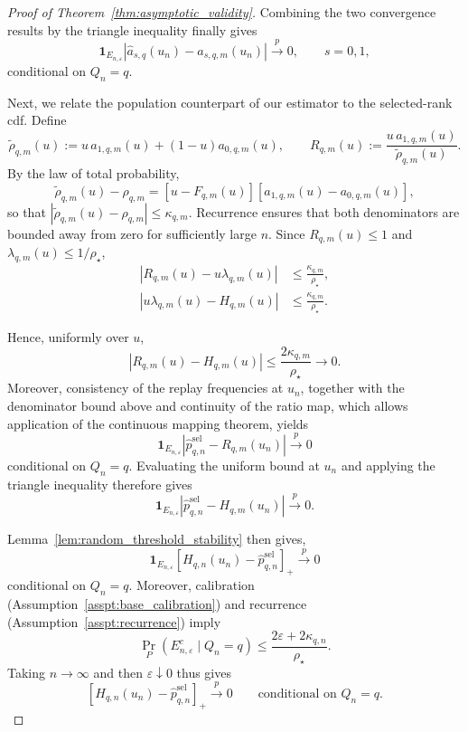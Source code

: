 \documentclass[10pt]{article}
\begin{document}
\begin{proof}[Proof of Theorem~\ref{thm:asymptotic_validity}]
Combining the two convergence results by the
triangle inequality finally gives
\[
\mathbf 1_{E_{n,\varepsilon}}
\left|\widehat a_{s,q}(u_n)
-a_{s,q,m}(u_n)\right|
\stackrel{p}{\longrightarrow}0,
\qquad s=0,1,
\]
conditional on $Q_n=q$.

Next, we relate the population counterpart of our estimator
to the selected-rank cdf. Define
\[
\widetilde\rho_{q,m}(u)
:=u\,a_{1,q,m}(u)+(1-u)a_{0,q,m}(u),
\qquad
R_{q,m}(u)
:=\frac{u\,a_{1,q,m}(u)}{\widetilde\rho_{q,m}(u)}.
\]
By the law of total probability,
\[
\widetilde\rho_{q,m}(u)-\rho_{q,m}
=
[u-F_{q,m}(u)]
[a_{1,q,m}(u)-a_{0,q,m}(u)],
\]
so that
$|\widetilde\rho_{q,m}(u)-\rho_{q,m}|
\le\kappa_{q,m}$.
Recurrence ensures that both denominators are bounded away
from zero for sufficiently large $n$. Since
$R_{q,m}(u)\le1$ and $\lambda_{q,m}(u)\le1/\rho_\star$,
\[
\begin{aligned}
|R_{q,m}(u)-u\lambda_{q,m}(u)|
&\le\frac{\kappa_{q,m}}{\rho_\star},\\
|u\lambda_{q,m}(u)-H_{q,m}(u)|
&\le\frac{\kappa_{q,m}}{\rho_\star}.
\end{aligned}
\]

Hence, uniformly over $u$,
\[
|R_{q,m}(u)-H_{q,m}(u)|
\le\frac{2\kappa_{q,m}}{\rho_\star}
\longrightarrow0.
\]
Moreover, consistency of the replay frequencies at
$u_n$, together with the denominator bound above
and continuity of the ratio map, which allows application of the continuous mapping theorem, yields
\[
\mathbf1_{E_{n,\varepsilon}}
|\widehat p_{q,n}^{\mathrm{sel}}
-R_{q,m}(u_n)|
\stackrel{p}{\longrightarrow}0
\]
conditional on $Q_n=q$. Evaluating the uniform
bound at $u_n$ and applying the triangle
inequality therefore gives
\[
\mathbf1_{E_{n,\varepsilon}}
|\widehat p_{q,n}^{\mathrm{sel}}
-H_{q,m}(u_n)|
\stackrel{p}{\longrightarrow}0.
\]

Lemma~\ref{lem:random_threshold_stability} then gives,
\[
\mathbf1_{E_{n,\varepsilon}}
[H_{q,n}(u_{n})-\widehat p_{q,n}^{\mathrm{sel}}]_+
\stackrel{p}{\longrightarrow}0
\]
conditional on $Q_n=q$.
Moreover, calibration (Assumption~\ref{asspt:base_calibration}) and recurrence (Assumption~\ref{asspt:recurrence}) imply
\[
\Pr_P(E_{n,\varepsilon}^c\mid Q_n=q)
\le\frac{2\varepsilon+2\kappa_{q,n}}{\rho_\star}.
\]
Taking $n\to\infty$ and then $\varepsilon\downarrow0$
thus gives
\[
[H_{q,n}(u_n)-\widehat p_{q,n}^{\mathrm{sel}}]_+
\stackrel{p}{\longrightarrow}0
\qquad\text{conditional on }Q_n=q.
\]


\end{proof}
\end{document}
